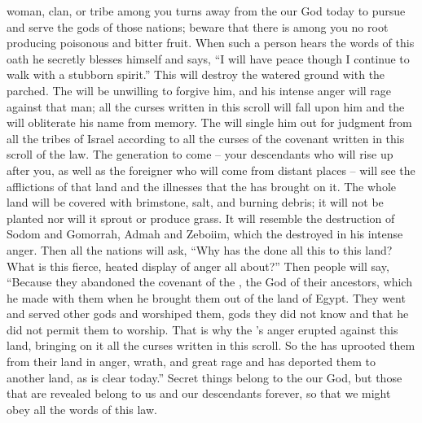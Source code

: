 {woman,
clan,
or
tribe
among you turns away
from the
{}
our God
today
to
pursue
and serve
the gods
of those
nations;
beware
that there is
among you no root
producing
poisonous
and bitter fruit.
When such a person hears
the words
of this
oath
he secretly blesses
himself
and says,
“I will
have peace
though I continue to walk
with a stubborn
spirit.”
This
will destroy
the watered
ground with the parched.
The
{}
will
be unwilling
to forgive
him, and his
intense
anger
will rage
against that
man;
all
the curses
written
in this
scroll
will fall
upon him and the
{}
will obliterate
his name
from
memory.
The
{}
will single
him out for judgment
from all
the tribes
of Israel
according to all
the curses
of the covenant
written
in this
scroll
of the law.
The generation to come – your descendants who will rise up after you, as well as the foreigner who will come from distant places – will see the afflictions of that land and the illnesses that the
{} has brought on it.
The whole
land
will be covered with brimstone,
salt,
and burning
debris; it will not
be planted
nor
will it sprout
or
produce grass.
It will resemble the destruction
of Sodom
and Gomorrah,
Admah
and Zeboiim,
which
the {}
destroyed
in his intense
anger.
Then all
the nations
will ask, “Why
has the
{}
done
all this
to this
land? What
is this fierce,
heated
display of anger
all about?”
Then people will say,
“Because they abandoned
the
covenant
of the {}, the God
of their ancestors,
which
he made
with
them when he brought them out
of the
land
of Egypt.
They went
and served
other
gods
and worshiped
them, gods
they did not
know
and that he did not
permit them to worship.
That is
why the
{}’s
anger
erupted
against this land,
bringing
on
it all
the curses
written
in this
scroll.
So the
{}
has uprooted
them
from their land
in anger,
wrath,
and great
rage
and has deported them
to
another
land,
as is clear
today.”
Secret
things belong to the
{}
our God,
but those that are revealed
belong to us and our descendants
forever,
so
that we
might obey
all
the words
of this
law.

\par }

